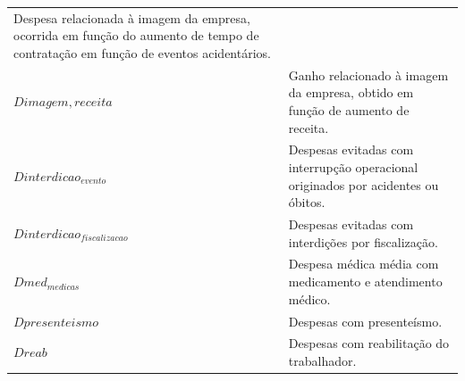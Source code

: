 \documentclass[]{article}
\begin{document}
\begin{longtable}[]{@{}ll@{}}
\begin{minipage}[t]{0.87\columnwidth}
Despesa relacionada à imagem da empresa, ocorrida em função do aumento
de tempo de contratação em função de eventos acidentários.\strut
\end{minipage}\tabularnewline
\begin{minipage}[t]{0.07\columnwidth}\raggedright\strut
\(Dimagem, receita\)\strut
\end{minipage} & \begin{minipage}[t]{0.87\columnwidth}\raggedright\strut
Ganho relacionado à imagem da empresa, obtido em função de aumento de
receita.\strut
\end{minipage}\tabularnewline
\begin{minipage}[t]{0.07\columnwidth}\raggedright\strut
\(Dinterdicao_{evento}\)\strut
\end{minipage} & \begin{minipage}[t]{0.87\columnwidth}\raggedright\strut
Despesas evitadas com interrupção operacional originados por acidentes
ou óbitos.\strut
\end{minipage}\tabularnewline
\begin{minipage}[t]{0.07\columnwidth}\raggedright\strut
\(Dinterdicao_{fiscalizacao}\)\strut
\end{minipage} & \begin{minipage}[t]{0.87\columnwidth}\raggedright\strut
Despesas evitadas com interdições por fiscalização.\strut
\end{minipage}\tabularnewline
\begin{minipage}[t]{0.07\columnwidth}\raggedright\strut
\(Dmed_{medicas}\)\strut
\end{minipage} & \begin{minipage}[t]{0.87\columnwidth}\raggedright\strut
Despesa médica média com medicamento e atendimento médico.\strut
\end{minipage}\tabularnewline
\begin{minipage}[t]{0.07\columnwidth}\raggedright\strut
\(Dpresenteismo\)\strut
\end{minipage} & \begin{minipage}[t]{0.87\columnwidth}\raggedright\strut
Despesas com presenteísmo.\strut
\end{minipage}\tabularnewline
\begin{minipage}[t]{0.07\columnwidth}\raggedright\strut
\(Dreab\)\strut
\end{minipage} & \begin{minipage}[t]{0.87\columnwidth}\raggedright\strut
Despesas com reabilitação do trabalhador.\strut
\end{minipage}\tabularnewline

\end{longtable}
\end{document}
